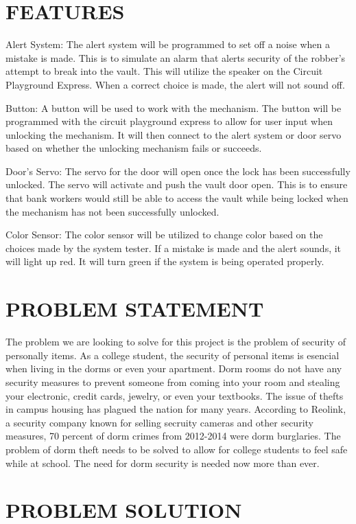\documentclass[12pt]{article}
\begin{document}
\section{FEATURES}

Alert System:
The alert system will be programmed to set off a noise when a mistake is made. This is to simulate an alarm that alerts security of the robber's attempt to break into the vault. This will utilize the speaker on the Circuit Playground Express. When a correct choice is made, the alert will not sound off. 

Button:
A button will be used to work with the mechanism. The button will be programmed with the circuit playground express to allow for user input when unlocking the mechanism. It will then connect to the alert system or door servo based on whether the unlocking mechanism fails or succeeds.

Door's Servo:
The servo for the door will open once the lock has been successfully unlocked. The servo will activate and push the vault door open. This is to ensure that bank workers would still be able to access the vault while being locked when the mechanism has not been successfully unlocked.

Color Sensor:
The color sensor will be utilized to change color based on the choices made by the system tester. If a mistake is made and the alert sounds, it will light up red. It will turn green if the system is being operated properly.

\section{PROBLEM STATEMENT}
The problem we are looking to solve for this project is the problem of security of personally items. As a college student, the security of personal items is esencial when living in the dorms or even your apartment. Dorm rooms do not have any security measures to prevent someone from coming into your room and stealing your electronic, credit cards, jewelry, or even your textbooks. The issue of thefts in campus housing has plagued the nation for many years. According to Reolink, a security company known for selling secruity cameras and other security measures, 70 percent of dorm crimes from 2012-2014 were dorm burglaries.\cite{Hu} The problem of dorm theft needs to be solved to allow for college students to feel safe while at school. The need for dorm security is needed now more than ever.

\section{PROBLEM SOLUTION}
\end{document}
